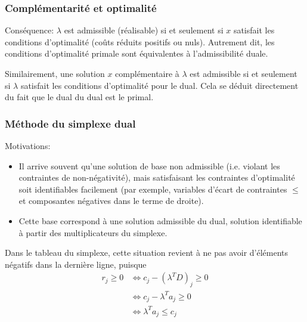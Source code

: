 \documentclass[usepdftitle=false]{beamer}
\begin{document}
\begin{frame}
	\frametitle{Complémentarité et optimalité}
	
	Conséquence: $\lambda$ est admissible (réalisable) si et seulement si $x$ satisfait les conditions d'optimalité (coûts réduits positifs ou nuls).
	Autrement dit, les conditions d'optimalité primale sont équivalentes à l'admissibilité duale.
	
	\mbox{}
	
	Similairement, une solution $x$ complémentaire à $\lambda$ est admissible si et seulement si $\lambda$ satisfait les conditions d’optimalité pour le dual. Cela se déduit directement du fait que le dual du dual est le primal.
	
\end{frame}

\begin{frame}
	\frametitle{Méthode du simplexe dual}
	
	Motivations:
	\begin{itemize}
		\item
		Il arrive souvent qu’une solution de base non admissible (i.e. violant les contraintes de non-négativité), mais satisfaisant les contraintes d'optimalité soit identifiables facilement (par exemple, variables d’écart de contraintes $\leq$ et composantes négatives dans le terme de droite).
		\item
		Cette base correspond à une solution admissible du dual, solution identifiable à partir des multiplicateurs du simplexe.
	\end{itemize}
	
	
	\mbox{}
	
	Dans le tableau du simplexe, cette situation revient à ne pas avoir d'éléments négatifs dans la dernière ligne, puisque
	\begin{align*}
		r_{j} \geq 0 
		& \Leftrightarrow c_{j} - (\lambda^T D)_j \geq 0 \\
		& \Leftrightarrow c_{j} - \lambda^T a_j \geq 0 \\
		& \Leftrightarrow \lambda^T a_j \leq c_j \\
	\end{align*}
	
\end{frame}
\end{document}
